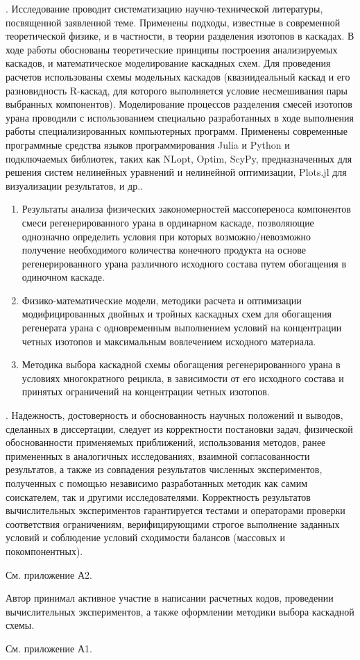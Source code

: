 {\methods}.
Исследование проводит систематизацию научно-технической литературы, посвященной заявленной теме.
Применены подходы, известные в современной теоретической физике, и в частности, в теории разделения изотопов в каскадах.
В ходе работы обоснованы теоретические принципы построения анализируемых каскадов, и математическое моделирование каскадных схем.
Для проведения расчетов использованы схемы модельных каскадов (квазиидеальный каскад и его разновидность R-каскад, для которого выполняется условие несмешивания пары выбранных компонентов). Моделирование процессов разделения смесей изотопов урана проводили с использованием специально разработанных в ходе выполнения работы специализированных компьютерных программ. Применены современные программные средства языков программирования Julia и Python и подключаемых библиотек, таких как NLopt, Optim, ScyPy, предназначенных для решения систем нелинейных уравнений и нелинейной оптимизации, Plots.jl для визуализации результатов, и др..

{}
\begin{enumerate}
  \item Результаты анализа физических закономерностей массопереноса компонентов смеси регенерированного урана в ординарном каскаде, позволяющие однозначно определить условия при которых возможно/невозможно получение необходимого количества конечного продукта на основе регенерированного урана различного исходного состава путем обогащения в одиночном каскаде.
  \item Физико-математические модели, методики расчета и оптимизации модифицированных двойных и тройных каскадных схем для обогащения регенерата урана с одновременным выполнением условий на концентрации четных изотопов и максимальным вовлечением исходного материала.
  \item Методика выбора каскадной схемы обогащения регенерированного урана в условиях многократного рецикла, в зависимости от его исходного состава и принятых ограничений на концентрации четных изотопов.
\end{enumerate}

{\reliability}.
Надежность, достоверность и обоснованность научных положений и выводов, сделанных в диссертации, следует из корректности постановки задач, физической обоснованности применяемых приближений, использования методов, ранее примененных в аналогичных исследованиях, взаимной согласованности результатов, а также из совпадения результатов численных экспериментов, полученных с помощью независимо разработанных методик как самим соискателем, так и другими исследователями. Корректность результатов вычислительных экспериментов гарантируется тестами и операторами проверки соответствия ограничениям, верифицирующими строгое выполнение заданных условий и соблюдение условий сходимости балансов (массовых и покомпонентных).

{\probation}
См. приложение А2.

{\contribution} Автор принимал активное участие в написании расчетных кодов, проведении вычислительных экспериментов, а также оформлении методики выбора каскадной схемы.

{\publications} 
См. приложение А1.

